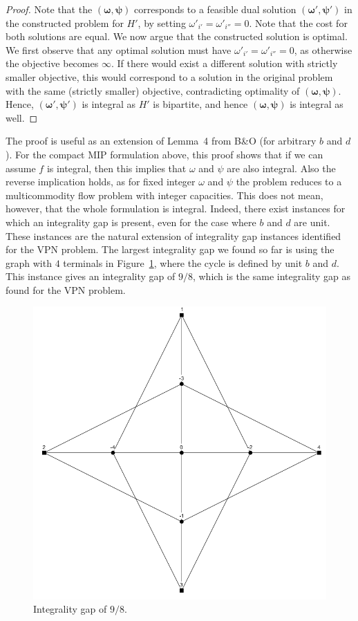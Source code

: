\documentclass[11pt]{article}
\begin{document}
\begin{proof}
        Note that the $(\boldsymbol \omega, \boldsymbol \psi)$ corresponds to a feasible dual solution $(\boldsymbol \omega', \boldsymbol \psi')$ in the constructed problem for $H'$, by setting $\omega'_{i'} = \omega'_{i''} = 0$.
        Note that the cost for both solutions are equal.
        We now argue that the constructed solution is optimal.
        We first observe that any optimal solution must have $\omega'_{i'} = \omega'_{i''} = 0$, as otherwise the objective becomes $\infty$.
        If there would exist a different solution with strictly smaller objective, this would correspond to a solution in the original problem with the same (strictly smaller) objective, contradicting optimality of $(\boldsymbol \omega, \boldsymbol \psi)$.
        Hence, $(\boldsymbol \omega', \boldsymbol \psi')$ is integral as $H'$ is bipartite, and hence $(\boldsymbol \omega, \boldsymbol \psi)$ is integral as well.
    \end{proof}

    The proof is useful as an extension of Lemma~4 from B\&O (for arbitrary $b$ and $d$).
    For the compact MIP formulation above, this proof shows that if we can assume $f$ is integral, then this implies that $\omega$ and $\psi$ are also integral.
    Also the reverse implication holds, as for fixed integer $\omega$ and $\psi$ the problem reduces to a multicommodity flow problem with integer capacities.
    This does not mean, however, that the whole formulation is integral.
    Indeed, there exist instances for which an integrality gap is present, even for the case where $b$ and $d$ are unit.
    These instances are the natural extension of integrality gap instances identified for the VPN problem.
    The largest integrality gap we found so far is using the graph with $4$ terminals in Figure~\ref{fig:gap4}, where the cycle is defined by unit $b$ and $d$.
    This instance gives an integrality gap of $9/8$, which is the same integrality gap as found for the VPN problem.

    \begin{figure}[h]
        \centering
        \includegraphics[width=.45\textwidth]{gap4}
        \caption{Integrality gap of $9/8$.} \label{fig:gap4}
    \end{figure}
\end{document}
